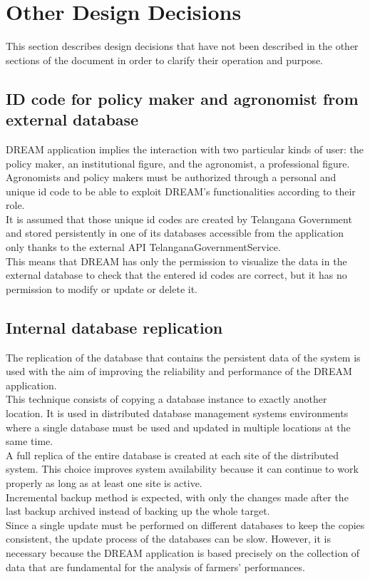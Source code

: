 \section{Other Design Decisions}
This section describes design decisions that have not been described in the other sections of the document in order to clarify their operation and purpose.

\subsection{ID code for policy maker and agronomist from external database}
DREAM application implies the interaction with two particular kinds of user: the policy maker, an institutional figure, and the agronomist, a professional figure. Agronomists and policy makers must be authorized through a personal and unique id code to be able to exploit DREAM's functionalities according to their role. \\

It is assumed that those unique id codes are created by Telangana Government and stored persistently in one of its databases accessible from the application only thanks to the external API TelanganaGovernmentService.\\

This means that DREAM has only the permission to visualize the data in the external database to check that the entered id codes are correct, but it has no permission to modify or update or delete it.

\subsection{Internal database replication}
The replication of the database that contains the persistent data of the system is used with the aim of improving the reliability and performance of the DREAM application.\\

This technique consists of copying a database instance to exactly another location. It is used in distributed database management systems environments where a single database must be used and updated in multiple locations at the same time.\\
A full replica of the entire database is created at each site of the distributed system. This choice improves system availability because it can continue to work properly as long as at least one site is active.\\

Incremental backup method is expected, with only the changes made after the last backup archived instead of backing up the whole target. \\

Since a single update must be performed on different databases to keep the copies consistent, the update process of the databases can be slow. However, it is necessary because the DREAM application is based precisely on the collection of data that are fundamental for the analysis of farmers' performances.


